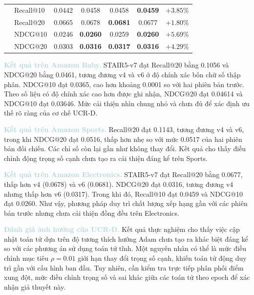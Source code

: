 \begin{table}[!htbp]
{\begin{tabular}{@{}llccccc@{}}
        & Recall@10 & 0.0442 & 0.0458 & 0.0458 & \textbf{0.0459} & $+3.85\%$ \\
        & Recall@20 & 0.0665 & 0.0678 & \textbf{0.0681} & 0.0677 & $+1.80\%$ \\
        & NDCG@10   & 0.0246 & \textbf{0.0260} & 0.0259 & \textbf{0.0260} & $+5.69\%$ \\
        & NDCG@20   & 0.0303 & \textbf{0.0316} & \textbf{0.0317} & \textbf{0.0316} & $+4.29\%$ \\

        \bottomrule
    \end{tabular}%
    }
\end{table}

\noindent\textcolor{lightblue}{\textbf{Kết quả trên Amazon Baby.}} STAIR5-v7 đạt Recall@20 bằng 0.1056 và NDCG@20 bằng 0.0461, tương đương v4 và v6 ở độ chính xác bốn chữ số thập phân. NDCG@10 đạt 0.0365, cao hơn khoảng 0.0001 so với hai phiên bản trước. Theo số liệu có độ chính xác cao hơn được ghi nhận, NDCG@20 đạt 0.04614 và NDCG@10 đạt 0.03646. Mức cải thiện nhìn chung nhỏ và chưa đủ để xác định ưu thế rõ ràng của cơ chế UCR-D.

\noindent\textcolor{lightblue}{\textbf{Kết quả trên Amazon Sports.}} Recall@20 đạt 0.1143, tương đương v4 và v6, trong khi NDCG@20 đạt 0.0516, thấp hơn nhẹ so với mức 0.0517 của hai phiên bản đối chiếu. Các chỉ số còn lại gần như không thay đổi. Kết quả cho thấy điều chỉnh động trọng số cạnh chưa tạo ra cải thiện đáng kể trên Sports.

\noindent\textcolor{lightblue}{\textbf{Kết quả trên Amazon Electronics.}} STAIR5-v7 đạt Recall@20 bằng 0.0677, thấp hơn v4 (0.0678) và v6 (0.0681). NDCG@20 đạt 0.0316, tương đương v4 nhưng thấp hơn v6 (0.0317). Trong khi đó, Recall@10 đạt 0.0459 và NDCG@10 đạt 0.0260. Như vậy, phương pháp duy trì chất lượng xếp hạng gần với các phiên bản trước nhưng chưa cải thiện đồng đều trên Electronics.

\noindent\textcolor{lightblue}{\textbf{Đánh giá ảnh hưởng của UCR-D.}} Kết quả thực nghiệm cho thấy việc cập nhật toán tử dựa trên độ tương thích hướng Adam chưa tạo ra khác biệt đáng kể so với các phương án sử dụng toán tử tĩnh. Một nguyên nhân có thể là mức điều chỉnh mục tiêu $\rho=0.01$ giới hạn thay đổi trọng số cạnh, khiến toán tử động duy trì gần với cấu hình ban đầu. Tuy nhiên, cần kiểm tra trực tiếp phân phối điểm xung đột, mức điều chỉnh trọng số và sai khác giữa các toán tử theo epoch để xác nhận giả thuyết này.



